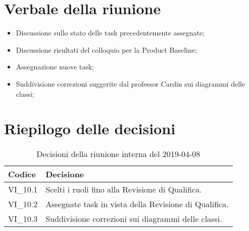 \section{Verbale della riunione}
\begin{itemize}
	\item Discussione sullo stato delle task precedentemente assegnate;
	\item Discussione risultati del colloquio per la Product Baseline\glo;
	\item Assegnazione nuove task;
	\item Suddivisione correzioni suggerite dal professor Cardin sui diagrammi 
	delle classi;
	
\end{itemize}

\hspace{3cm}

\section{Riepilogo delle decisioni}

	
	\begin{longtable}{ >{\centering}p{} >{}p{}}
		\caption{Decisioni della riunione interna del 2019-04-08}\\	
		\rowcolorhead
		\textbf{\color{white}Codice} 
		& \centering\textbf{\color{white}Decisione} 
		\tabularnewline 
		\endfirsthead
		VI\_10.1 & Scelti i ruoli fino alla Revisione di Qualifica.
		\tabularnewline 
		VI\_10.2 & Assegnate task in vista della Revisione di Qualifica.
		\tabularnewline
		VI\_10.3 & Suddivisione correzioni sui diagrammi delle classi.\\
		
	\end{longtable}
	




